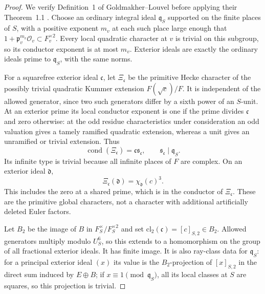 \begin{proof}
We verify Definition~1 of Goldmakher--Louvel before applying their
Theorem~1.1 \cite{GoldmakherLouvel13}.  Choose an ordinary integral ideal
$\mathfrak q_S$ supported on the finite places of $S$, with a positive
exponent $m_v$ at each such place large enough that
$1+\mathfrak p_v^{m_v}\mathcal O_v\subset F_v^{\times2}$.
Every local quadratic character at $v$ is trivial on this subgroup, so its
conductor exponent is at most $m_v$.  Exterior ideals are exactly the
ordinary ideals prime to $\mathfrak q_S$, with the same norms.

For a squarefree exterior ideal $\mathfrak c$, let $\Xi_{\mathfrak c}$ be
the primitive Hecke character of the possibly trivial quadratic Kummer extension
$F(\sqrt c)/F$.  It is independent of the allowed generator, since two
such generators differ by a sixth power of an $S$-unit.  At an exterior
prime its local conductor exponent is one if the prime divides
$\mathfrak c$ and zero otherwise: at the odd residue characteristics under
consideration an odd valuation gives a tamely ramified quadratic extension,
whereas a unit gives an unramified or trivial extension.  Thus
\[
 \operatorname{cond}(\Xi_{\mathfrak c})
       =\mathfrak c\mathfrak s_{\mathfrak c},
 \qquad \mathfrak s_{\mathfrak c}\mid\mathfrak q_S.
\]
Its infinite type is trivial because all infinite places of $F$ are complex.
On an exterior ideal $\mathfrak d$,
\[
 \Xi_{\mathfrak c}(\mathfrak d)=\chi_{\mathfrak d}(c)^3.
\]
This includes the zero at a shared prime, which is in the conductor of
$\Xi_{\mathfrak c}$.  These are the primitive global characters, not a
character with additional artificially deleted Euler factors.

Let $B_2$ be the image of $B$ in $F_S^\times/F_S^{\times2}$ and set
$\mathrm{cl}_2(\mathfrak c)=[c]_{S,2}\in B_2$.  Allowed generators
multiply modulo $U_S^6$, so this extends to a homomorphism on the group of
all fractional exterior ideals.  It has finite image.  It is also ray-class
data for $\mathfrak q_S$: for a principal exterior ideal $(x)$ its value is
the $B_2$-projection of $[x]_{S,2}$ in the direct sum induced by $E\oplus B$;
if $x\equiv1\pmod{\mathfrak q_S}$, all its local classes at $S$ are squares,
so this projection is trivial.


\end{proof}
